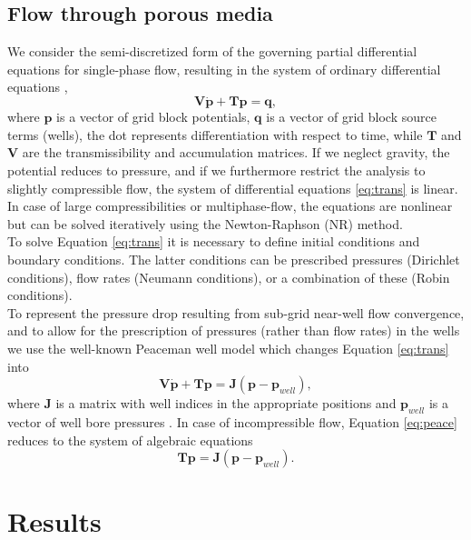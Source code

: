 \documentclass[12pt]{article}
\begin{document}
\subsection*{Flow through porous media}
\hspace{0.5cm}We consider the semi-discretized form of the governing partial 
differential equations for single-phase flow, resulting in the system of 
ordinary differential equations \cite{Jansen13}, 
\begin{equation}\label{eq:trans}
 \mathbf{V}\dot{\mathbf{p}}+\mathbf{T}\mathbf{p}=\mathbf{q},
\end{equation}
where $\mathbf{p}$ is a vector of grid block potentials, $\mathbf{q}$ is a vector of grid block source terms (wells), 
the dot represents differentiation with respect to time, while $\mathbf{T}$ and 
$\mathbf{V}$ are the transmissibility and accumulation matrices.
If we neglect gravity, the potential reduces to pressure, and if we furthermore restrict the analysis to slightly 
compressible flow, the system of differential equations \eqref{eq:trans} is linear. 
In case of large compressibilities or multiphase-flow, the equations are nonlinear but can be solved iteratively 
using the Newton-Raphson (NR) method.\\
To solve Equation \eqref{eq:trans} it is necessary to define initial conditions and boundary conditions.
The latter conditions can be prescribed pressures (Dirichlet conditions), 
flow rates (Neumann conditions), or a combination of these (Robin conditions).\\
To represent the pressure drop resulting from sub-grid near-well flow convergence, and to allow for the 
prescription of pressures (rather than flow rates) in the wells we use the well-known 
Peaceman well model which changes Equation  \eqref{eq:trans} into
 \begin{equation}\label{eq:peace}
  \mathbf{V}\dot{\mathbf{p}} + \mathbf{T}\mathbf{p} = \mathbf{J}(\mathbf{p}-\mathbf{p}_{well}),
\end{equation}
where $\mathbf{J}$ is a matrix with well indices in the appropriate positions and $\mathbf{p}_{well}$ is a 
vector of well bore pressures \cite{Jansen13}. In case of incompressible flow, Equation \eqref{eq:peace} reduces to 
the system of algebraic equations 
 \begin{equation}\label{eq:peac1}
\mathbf{T}\mathbf{p} = \mathbf{J}(\mathbf{p}-\mathbf{p}_{well}).
\end{equation}


\section{Results}
\end{document}
